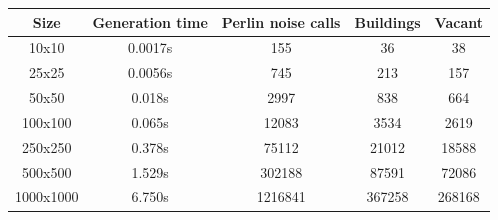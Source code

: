 	\begin{center}
		\begin{tabular}{||c | c c c c||} 
			\hline
			Size & Generation time & Perlin noise calls & Buildings & Vacant \\ [0.9ex] 
			\hline\hline
			10x10 & 0.0017s & 155 & 36 & 38 \\ 
			\hline
			25x25 & 0.0056s & 745 & 213 & 157 \\
			\hline
			50x50 & 0.018s & 2997 & 838 & 664 \\
			\hline
			100x100 & 0.065s & 12083 & 3534 & 2619 \\
			\hline
			250x250 & 0.378s & 75112 & 21012 & 18588 \\
			\hline
			500x500 & 1.529s & 302188 & 87591 & 72086 \\
			\hline
			1000x1000 & 6.750s & 1216841 & 367258 & 268168 \\ [2ex] 
			\hline
		\end{tabular}
	\end{center}
	
